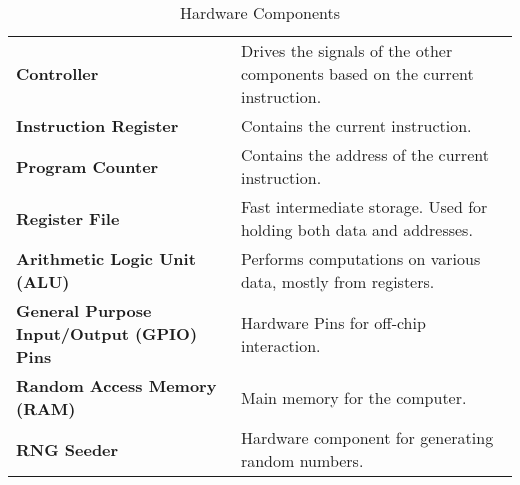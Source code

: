 \newcommand{\hw}[2]{%
	\textbf{#1} & #2 \\%
	\hline%
}
\begin{table}[H]
	\begin{tabularx}{\textwidth}{| a | x |}
		\hline
		 &  \\
		\hline
		\hw{Controller}{Drives the signals of the other components based on the current instruction.}
		\hw{Instruction Register}{Contains the current instruction.}
		\hw{Program Counter}{Contains the address of the current instruction.}
		\hw{Register File}{Fast intermediate storage. Used for holding both data and addresses.}
		\hw{Arithmetic Logic Unit (ALU)}{Performs computations on various data, mostly from registers.}
		\hw{General Purpose Input/Output (GPIO)
			Pins}{Hardware Pins for off-chip interaction.}
		\hw{Random Access Memory (RAM)}{Main memory for the computer.}
		\hw{RNG Seeder}{Hardware component for generating random numbers.}
	\end{tabularx}
	\label{Tab:hardware}
	\caption{Hardware Components}
\end{table}


